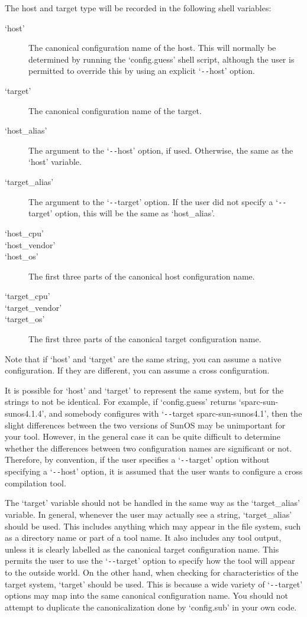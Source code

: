 The host and target type will be recorded in the following shell variables: 

\begin{description}
\item[`host']

    The canonical configuration name of the host. This will normally be determined by running the `config.guess' shell script, although the user is permitted to override this by using an explicit `\verb+--+host' option. 
\item[`target']
    The canonical configuration name of the target. 
\item[`host\_{}alias']
    The argument to the `\verb+--+host' option, if used. Otherwise, the same as the `host' variable. 
\item[`target\_{}alias']
    The argument to the `\verb+--+target' option. If the user did not specify a `\verb+--+target' option, this will be the same as `host\_{}alias'. 
\item[`host\_{}cpu']
\item[`host\_{}vendor']
\item[`host\_{}os']
    The first three parts of the canonical host configuration name. 
\item[`target\_{}cpu']
\item[`target\_{}vendor']
\item[`target\_{}os']
    The first three parts of the canonical target configuration name.
\end{description}

Note that if `host' and `target' are the same string, you can assume a native configuration. If they are different, you can assume a cross configuration.

It is possible for `host' and `target' to represent the same system, but for the strings to not be identical. For example, if `config.guess' returns `sparc-sun-sunos4.1.4', and somebody configures with `\verb+--+target sparc-sun-sunos4.1', then the slight differences between the two versions of SunOS may be unimportant for your tool. However, in the general case it can be quite difficult to determine whether the differences between two configuration names are significant or not. Therefore, by convention, if the user specifies a `\verb+--+target' option without specifying a `\verb+--+host' option, it is assumed that the user wants to configure a cross compilation tool.

The `target' variable should not be handled in the same way as the `target\_{}alias' variable. In general, whenever the user may actually see a string, `target\_{}alias' should be used. This includes anything which may appear in the file system, such as a directory name or part of a tool name. It also includes any tool output, unless it is clearly labelled as the canonical target configuration name. This permits the user to use the `\verb+--+target' option to specify how the tool will appear to the outside world. On the other hand, when checking for characteristics of the target system, `target' should be used. This is because a wide variety of `\verb+--+target' options may map into the same canonical configuration name. You should not attempt to duplicate the canonicalization done by `config.sub' in your own code.

